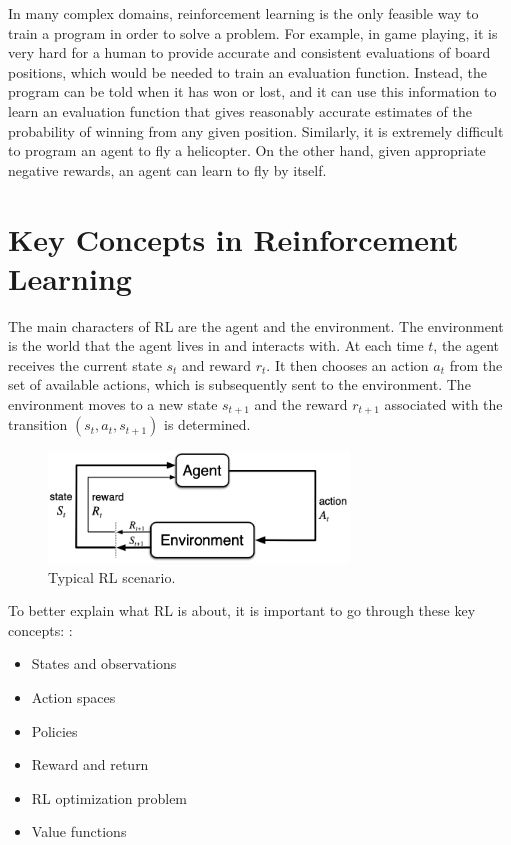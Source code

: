 \documentclass{article}
\begin{document}
In many complex domains, reinforcement learning is the only feasible way to train a program in order to solve a problem. For example, in game playing, it is very hard for a human to provide accurate and consistent evaluations of board positions, which would be needed to train an evaluation function. Instead, the program can be told when it has won or lost, and it can use this information to learn an evaluation function that gives reasonably accurate estimates of the probability of winning from any given position. Similarly, it is extremely difficult to program an agent to fly a helicopter. On the other hand, given appropriate negative rewards, an agent can learn to fly by itself.\cite{russell2016artificial}


\section{Key Concepts in Reinforcement Learning}

The main characters of RL are the agent and the environment. The environment is the world that the agent lives in and interacts with. At each time $t$, the agent receives the current state $s_t$ and reward $r_t$. It then chooses an action $a_t$ from the set of available actions, which is subsequently sent to the environment. The environment moves to a new state $s_{t+1}$ and the reward $r_{t+1}$ associated with the transition $(s_{t},a_{t},s_{t+1})$ is determined.

\begin{figure}
	\centering
	\includegraphics[width=8cm]{rl-loop.png}
	\caption{Typical RL scenario. \cite{10.5555/3312046}}
	\label{fig:rl-loop}
\end{figure}

To better explain what RL is about, it is important to go through these key concepts: \cite{SpinningUp2018}:

\begin{itemize}
	\item States and observations
	\item Action spaces
	\item Policies
	\item Reward and return
	\item RL optimization problem
	\item Value functions
\end{itemize}
\end{document}
